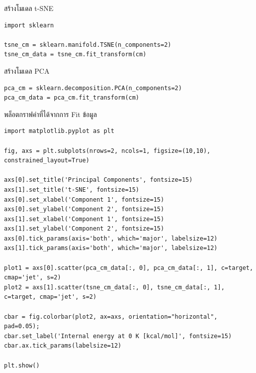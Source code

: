 \noindent สร้างโมเดล t-SNE
\begin{lstlisting}[style=MyPython]
import sklearn

tsne_cm = sklearn.manifold.TSNE(n_components=2)
tsne_cm_data = tsne_cm.fit_transform(cm)
\end{lstlisting}

\vspace{1em}
\noindent สร้างโมเดล PCA
\begin{lstlisting}[style=MyPython]
pca_cm = sklearn.decomposition.PCA(n_components=2)
pca_cm_data = pca_cm.fit_transform(cm)
\end{lstlisting}

\vspace{1em}
\noindent พล็อตกราฟค่าที่ได้จากการ Fit ข้อมูล
\begin{lstlisting}[style=MyPython]
import matplotlib.pyplot as plt

fig, axs = plt.subplots(nrows=2, ncols=1, figsize=(10,10), constrained_layout=True)

axs[0].set_title('Principal Components', fontsize=15)
axs[1].set_title('t-SNE', fontsize=15)
axs[0].set_xlabel('Component 1', fontsize=15)
axs[0].set_ylabel('Component 2', fontsize=15)
axs[1].set_xlabel('Component 1', fontsize=15)
axs[1].set_ylabel('Component 2', fontsize=15)
axs[0].tick_params(axis='both', which='major', labelsize=12)
axs[1].tick_params(axis='both', which='major', labelsize=12)

plot1 = axs[0].scatter(pca_cm_data[:, 0], pca_cm_data[:, 1], c=target, cmap='jet', s=2)
plot2 = axs[1].scatter(tsne_cm_data[:, 0], tsne_cm_data[:, 1], c=target, cmap='jet', s=2)

cbar = fig.colorbar(plot2, ax=axs, orientation="horizontal", pad=0.05);
cbar.set_label('Internal energy at 0 K [kcal/mol]', fontsize=15)
cbar.ax.tick_params(labelsize=12)

plt.show()
\end{lstlisting}

